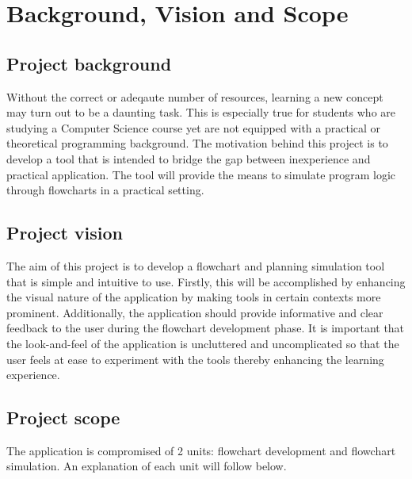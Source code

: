 \documentclass[11pt,a4paper,titlepage]{article}
\begin{document}


\newpage
\tableofcontents


\pagebreak

\section{Background, Vision and Scope}
\subsection{Project background}
Without the correct or adeqaute number of resources, learning a new concept may turn out to be a daunting task. This is especially true for students who are studying a Computer Science course yet are not equipped with a practical or theoretical programming background. The motivation behind this project is to develop a tool that is intended to bridge the  gap between inexperience and practical application. The tool will provide the means to simulate program logic through flowcharts in a practical setting. 

\subsection{Project vision}

The aim of this project is to develop a flowchart and planning simulation tool that is simple and intuitive to use. Firstly, this will be accomplished by enhancing the visual nature of the application by making tools in certain contexts more prominent. Additionally, the application should provide informative and clear feedback to the user during the flowchart development phase. It is important that the look-and-feel of the application is uncluttered and uncomplicated so that the user feels at ease to experiment with the tools thereby enhancing the learning experience.

\subsection{Project scope}

The application is compromised of 2 units: flowchart development and flowchart simulation. An explanation of each unit will follow below.
\end{document}
